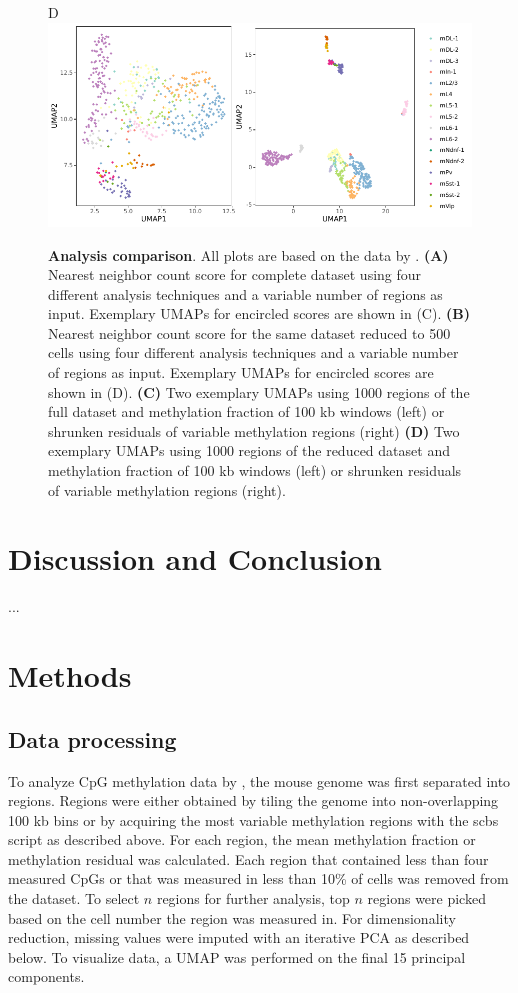 \documentclass[twocolumn,10pt]{article}
\begin{document}
\begin{figure}[!htp]
	D\\
	\hspace{.39cm}\includegraphics[width=\columnwidth]{leonie_plots/UMAP_reduceddataset.pdf}
	\caption{\small \textbf{Analysis comparison}. All plots are based on the data by \citealp{Luo_2017}. \textbf{(A)} Nearest neighbor count score for complete dataset using four different analysis techniques and a variable number of regions as input. Exemplary UMAPs for encircled scores are shown in (C). \textbf{(B)} Nearest neighbor count score for the same dataset reduced to 500 cells using four different analysis techniques and a variable number of regions as input. Exemplary UMAPs for encircled scores are shown in (D). \textbf{(C)} Two exemplary UMAPs using 1000 regions of the full dataset and methylation fraction of 100 kb windows (left) or shrunken residuals of variable methylation regions (right) \textbf{(D)} Two exemplary UMAPs using 1000 regions of the reduced dataset and methylation fraction of 100 kb windows (left) or shrunken residuals of variable methylation regions (right).}
	\label{figure:score}
\end{figure}


\section{Discussion and Conclusion}

...


\section{Methods}

\subsection{Data processing}
To analyze CpG methylation data by \citealp{Luo_2017}, the mouse genome was first separated into regions. Regions were either obtained by tiling the genome into non-overlapping 100 kb bins or by acquiring the most variable methylation regions with the scbs script as described above. For each region, the mean methylation fraction or methylation residual was calculated. Each region that contained less than four measured CpGs or that was measured in less than 10\% of cells was removed from the dataset. To select $n$ regions for further analysis, top $n$ regions were picked based on the cell number the region was measured in. 
For dimensionality reduction, missing values were imputed with an iterative PCA as described below. To visualize data, a UMAP was performed on the final 15 principal components.
\end{document}
